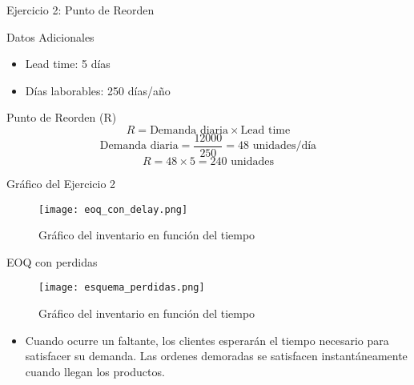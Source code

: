 \documentclass{beamer}
\begin{document}
\begin{frame}{Ejercicio 2: Punto de Reorden}
    \begin{block}{Datos Adicionales}
        \begin{itemize}
            \item Lead time: 5 días
            \item Días laborables: 250 días/año
        \end{itemize}
    \end{block}
    \pause
    \begin{alertblock}{Punto de Reorden (R)}
        \vspace{0.2cm}
        \[ R = \text{Demanda diaria} \times \text{Lead time} \]
        \[ \text{Demanda diaria} = \frac{12000}{250} = 48 \text{ unidades/día} \]
        \[ R = 48 \times 5 = 240 \text{ unidades} \]
    \end{alertblock}
\end{frame}

\begin{frame}{Gráfico del Ejercicio 2}
    \begin{figure}
        \centering
        \texttt{[image: eoq\_con\_delay.png]}
        \caption{Gráfico del inventario en función del tiempo}
    \end{figure}
\end{frame}

\begin{frame}{EOQ con perdidas}
    \begin{figure}
        \centering
        \texttt{[image: esquema\_perdidas.png]}
        \caption{Gráfico del inventario en función del tiempo}
    \end{figure}

\begin{itemize}
    \item Cuando ocurre un faltante, los clientes esperarán el tiempo necesario para satisfacer su demanda. Las ordenes demoradas se satisfacen instantáneamente cuando llegan los productos.
\end{itemize} 
\end{frame}
\end{document}
